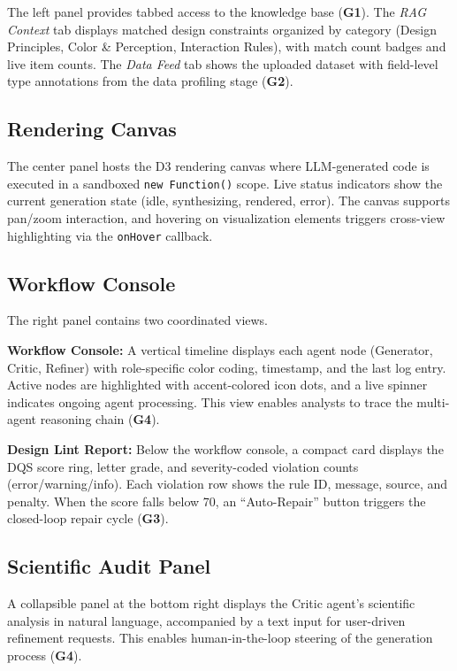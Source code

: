 \documentclass[final,5p,times,twocolumn]{elsarticle}
\begin{document}
The left panel provides tabbed access to the knowledge base (\textbf{G1}).
The \textit{RAG Context} tab displays matched design constraints organized by category (Design Principles, Color \& Perception, Interaction Rules), with match count badges and live item counts.
The \textit{Data Feed} tab shows the uploaded dataset with field-level type annotations from the data profiling stage (\textbf{G2}).

\subsection{Rendering Canvas}

The center panel hosts the D3 rendering canvas where LLM-generated code is executed in a sandboxed \texttt{new Function()} scope.
Live status indicators show the current generation state (idle, synthesizing, rendered, error).
The canvas supports pan/zoom interaction, and hovering on visualization elements triggers cross-view highlighting via the \texttt{onHover} callback.

\subsection{Workflow Console}

The right panel contains two coordinated views.

\textbf{Workflow Console:}
A vertical timeline displays each agent node (Generator, Critic, Refiner) with role-specific color coding, timestamp, and the last log entry.
Active nodes are highlighted with accent-colored icon dots, and a live spinner indicates ongoing agent processing.
This view enables analysts to trace the multi-agent reasoning chain (\textbf{G4}).

\textbf{Design Lint Report:}
Below the workflow console, a compact card displays the DQS score ring, letter grade, and severity-coded violation counts (error/warning/info).
Each violation row shows the rule ID, message, source, and penalty.
When the score falls below 70, an ``Auto-Repair'' button triggers the closed-loop repair cycle (\textbf{G3}).

\subsection{Scientific Audit Panel}

A collapsible panel at the bottom right displays the Critic agent's scientific analysis in natural language, accompanied by a text input for user-driven refinement requests.
This enables human-in-the-loop steering of the generation process (\textbf{G4}).
\end{document}
